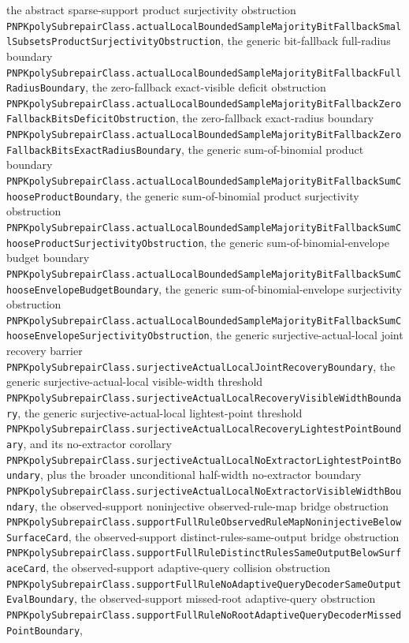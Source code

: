 \documentclass[11pt]{article}
\theoremstyle{remark}
\begin{document}
the abstract sparse-support product surjectivity obstruction
\texttt{PNPKpolySubrepairClass.actualLocalBoundedSampleMajorityBitFallbackSmallSubsetsProductSurjectivityObstruction},
the generic bit-fallback full-radius boundary
\texttt{PNPKpolySubrepairClass.actualLocalBoundedSampleMajorityBitFallbackFullRadiusBoundary},
the zero-fallback exact-visible deficit obstruction
\texttt{PNPKpolySubrepairClass.actualLocalBoundedSampleMajorityBitFallbackZeroFallbackBitsDeficitObstruction},
the zero-fallback exact-radius boundary
\texttt{PNPKpolySubrepairClass.actualLocalBoundedSampleMajorityBitFallbackZeroFallbackBitsExactRadiusBoundary},
the generic sum-of-binomial product boundary
\texttt{PNPKpolySubrepairClass.actualLocalBoundedSampleMajorityBitFallbackSumChooseProductBoundary},
the generic sum-of-binomial product surjectivity obstruction
\texttt{PNPKpolySubrepairClass.actualLocalBoundedSampleMajorityBitFallbackSumChooseProductSurjectivityObstruction},
the generic sum-of-binomial-envelope budget boundary
\texttt{PNPKpolySubrepairClass.actualLocalBoundedSampleMajorityBitFallbackSumChooseEnvelopeBudgetBoundary},
the generic sum-of-binomial-envelope surjectivity obstruction
\texttt{PNPKpolySubrepairClass.actualLocalBoundedSampleMajorityBitFallbackSumChooseEnvelopeSurjectivityObstruction},
the generic surjective-actual-local joint recovery barrier
\texttt{PNPKpolySubrepairClass.surjectiveActualLocalJointRecoveryBoundary},
the generic surjective-actual-local visible-width threshold
\texttt{PNPKpolySubrepairClass.surjectiveActualLocalRecoveryVisibleWidthBoundary},
the generic surjective-actual-local lightest-point threshold
\texttt{PNPKpolySubrepairClass.surjectiveActualLocalRecoveryLightestPointBoundary},
and its no-extractor corollary
\texttt{PNPKpolySubrepairClass.surjectiveActualLocalNoExtractorLightestPointBoundary},
plus the broader unconditional half-width no-extractor boundary
\texttt{PNPKpolySubrepairClass.surjectiveActualLocalNoExtractorVisibleWidthBoundary},
the observed-support noninjective observed-rule-map bridge obstruction
\texttt{PNPKpolySubrepairClass.supportFullRuleObservedRuleMapNoninjectiveBelowSurfaceCard},
the observed-support distinct-rules-same-output bridge obstruction
\texttt{PNPKpolySubrepairClass.supportFullRuleDistinctRulesSameOutputBelowSurfaceCard},
the observed-support adaptive-query collision obstruction
\texttt{PNPKpolySubrepairClass.supportFullRuleNoAdaptiveQueryDecoderSameOutputEvalBoundary},
the observed-support missed-root adaptive-query obstruction
\texttt{PNPKpolySubrepairClass.supportFullRuleNoRootAdaptiveQueryDecoderMissedPointBoundary},
\end{document}

